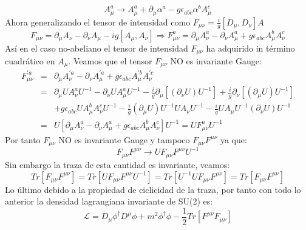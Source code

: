 \begin{equation}
A_{\mu}^{a}\to A_{\mu}^{a}+\partial_{\mu}\alpha^{a}-g\epsilon_{abc}\alpha^{b}A_{\mu}^{c}
\end{equation}
Ahora generalizando el tensor de intensidad como $F_{\mu\nu}=\frac{i}{g}[D_\mu,D_\nu]A$
\begin{equation}
F_{\mu\nu}=\partial_{\mu}A_{\nu}-\partial_{\nu}A_{\mu}-ig[A_{\mu},A_{\nu}]\Rightarrow F_{\mu\nu}^{a}=\partial_{\mu}A_{\nu}^{a}-\partial_{\nu}A_{\mu}^{a}+g\epsilon_{abc}A_{\mu}^{b}A_{\nu}^{c}
\end{equation}
Así en el caso no-abeliano el tensor de intensidad $F_{\mu\nu}$ ha adquirido in término cuadrático en $A_\mu$. Veamos que el tensor $F_{\mu\nu}$ NO es invariante Gauge:
\begin{eqnarray}
\nonumber F_{\mu\nu}^{\prime a}&=&\partial_{\mu}A_{\nu}^{\prime a}-\partial_{\nu}A_{\mu}^{\prime a}+g\epsilon_{abc}A_{\mu}^{\prime b}A_{\nu}^{\prime c}\\
\nonumber &=& \partial_{\mu}UA_{\nu}^{a}U^{-1}-\partial_{\nu}UA_{\mu}^{a}U^{-1}-\frac{i}{g}\partial_{\mu}[(\partial_{\nu}U)U^{-1}]+\frac{i}{g}\partial_{\nu}[(\partial_{\mu}U)U^{-1}]\\
\nonumber && +g\epsilon_{abc}UA_{\mu}^{b}A_{\nu}^{c}U^{-1}-\frac{i}{g}(\partial_{\mu}U)U^{-1}UA_{\nu}U^{-1}-\frac{i}{g}UA_{\mu}U^{-1}(\partial_{\nu}U)U^{-1}\\
&=& U[\partial_{\mu}A_{\nu}^{a}-\partial_{\nu}A_{\mu}^{a}+g\epsilon_{abc}A_{\mu}^{b}A_{\nu}^{c}]U^{-1}=UF_{\mu\nu}^{a}U^{-1}
\end{eqnarray}
Por tanto $F_{\mu\nu}$ NO es invariante Gauge y tampoco $F_{\mu\nu}F^{\mu\nu}$ ya que:
\begin{equation}
F_{\mu\nu}F^{\mu\nu}\to UF_{\mu\nu}F^{\mu\nu} U^{-1}
\end{equation}
Sin embargo la traza de esta cantidad es invariante, veamos:
\begin{equation}
Tr[F_{\mu\nu}F^{\mu\nu}]= Tr[UF_{\mu\nu}F^{\mu\nu} U^{-1}]=Tr[U^{-1}UF_{\mu\nu}F^{\mu\nu}]=Tr[F_{\mu\nu}F^{\mu\nu}]
\end{equation}
Lo último debido a la propiedad de ciclicidad de la traza, por tanto con todo lo anterior la densidad lagrangiana invariante de SU(2) es:
\begin{equation}
\mathcal{L}=D_{\mu}\phi^{\dagger}D^{\mu}\phi+m^{2}\phi^{\dagger}\phi-\frac{1}{2}Tr[F^{\mu\nu}F_{\mu\nu}]
\end{equation}









